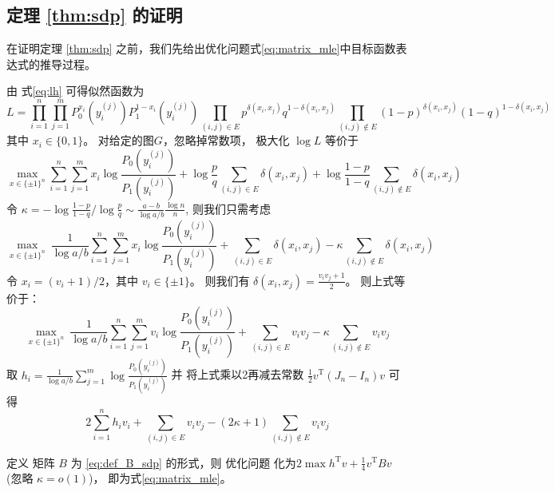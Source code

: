 \subsection{定理 \ref{thm:sdp} 的证明}
\label{sec:thm_sdp_proof}
在证明定理 \ref{thm:sdp}  之前，我们先给出优化问题式\eqref{eq:matrix_mle}中目标函数表达式的推导过程。

由 式\eqref{eq:lh} 可得似然函数为
$$
L=\prod_{i=1}^n \prod_{j=1}^m P_0^{x_i}(y_i^{(j)})P_1^{1-x_i}(y_i^{(j)})
\prod_{(i,j) \in E} p^{\delta(x_i, x_j)}q^{1-\delta(x_i, x_j)}
\prod_{(i,j)\not\in E} (1-p)^{\delta(x_i, x_j)}(1-q)^{1-\delta(x_i, x_j)}
$$
其中 $x_i \in \{0,1\}$。
对给定的图$G$，忽略掉常数项， 极大化 $ \log L$ 等价于
$$
\max_{x \in \{\pm 1\}^n} \sum_{i=1}^n \sum_{j=1}^m x_i \log \frac{P_0(y_i^{(j)})}{P_1(y_i^{(j)})}
+\log\frac{p}{q}\sum_{(i,j) \in E} \delta(x_i, x_j)
+\log \frac{1-p}{1-q}\sum_{(i,j)\not\in E} \delta(x_i, x_j)
$$
令 $\kappa = -\log\frac{1-p}{1-q} / \log\frac{p}{q} \sim \frac{a-b}{\log a/b}\frac{\log n}{n}$,
则我们只需考虑
$$
\max_{x \in \{\pm 1\}^n}\  \frac{1}{\log a/b}\sum_{i=1}^n \sum_{j=1}^m x_i \log \frac{P_0(y_i^{(j)})}{P_1(y_i^{(j)})}
+\sum_{(i,j) \in E} \delta(x_i, x_j)
-\kappa\sum_{(i,j)\not\in E} \delta(x_i, x_j)
$$
令 $x_i = (v_i+1)/2$，其中 $v_i \in \{\pm 1 \}$。
则我们有 $\delta(x_i, x_j) = \frac{v_i v_j + 1}{2}$。
则上式等价于：
$$
\max_{x \in \{\pm 1\}^n}\  \frac{1}{\log a/b}\sum_{i=1}^n \sum_{j=1}^m v_i \log \frac{P_0(y_i^{(j)})}{P_1(y_i^{(j)})}
+\sum_{(i,j) \in E} v_i v_j
-\kappa\sum_{(i,j)\not\in E} v_i v_j
$$
取 $h_i = \frac{1}{\log a/b}\sum_{j=1}^m \log \frac{P_0(y_i^{(j)})}{P_1(y_i^{(j)})}$
并
将上式乘以2再减去常数 $\frac{1}{2}v^{\mathrm{T}}(J_n-I_n)v$ 可得
$$
2\sum_{i=1}^n h_iv_i + \sum_{(i,j)\in E} v_i v_j - (2\kappa+1) \sum_{(i,j)\not\in E} v_i v_j
$$

定义 矩阵 $B$ 为 \eqref{eq:def_B_sdp} 的形式，则
优化问题 化为$2\max h^{\mathrm{T}} v + \frac{1}{4}v^{\mathrm{T}} B v$ (忽略 $\kappa=o(1)$)，
即为式\eqref{eq:matrix_mle}。

